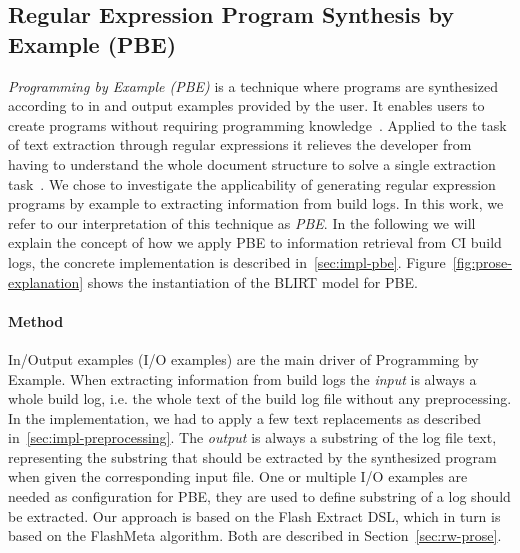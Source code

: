 \documentclass[\myrootdir/main.tex]{subfiles}
\begin{document}
\subsection{Regular Expression Program Synthesis by Example (PBE)}
\label{sec:expl-pbe}

\emph{Programming by Example (PBE)} is a technique where programs are synthesized according to in and output examples provided by the user.
It enables users to create programs without requiring programming knowledge~\cite{mayer2015user}.
Applied to the task of text extraction through regular expressions it relieves the developer from having to understand the whole document structure to solve a single extraction task~\cite{le2014flashextract:}.
We chose to investigate the applicability of generating regular expression programs by example to extracting information from build logs.
In this work, we refer to our interpretation of this technique as \emph{PBE}.
In the following we will explain the concept of how we apply PBE to information retrieval from CI build logs, the concrete implementation is described in~\ref{sec:impl-pbe}.
Figure~\ref{fig:prose-explanation} shows the instantiation of the BLIRT model for PBE.

\paragraph{Method}
In/Output examples (I/O examples) are the main driver of Programming by Example.
When extracting information from build logs the \emph{input} is always a whole build log, i.e. the whole text of the build log file without any preprocessing.
In the implementation, we had to apply a few text replacements as described in~\ref{sec:impl-preprocessing}.
The \emph{output} is always a substring of the log file text, representing the substring that should be extracted by the synthesized program when given the corresponding input file.
One or multiple I/O examples are needed as configuration for PBE, they are used to define substring of a log should be extracted.
Our approach is based on the Flash Extract DSL, which in turn is based on the FlashMeta algorithm.
Both are described in Section~\ref{sec:rw-prose}.

\end{document}
